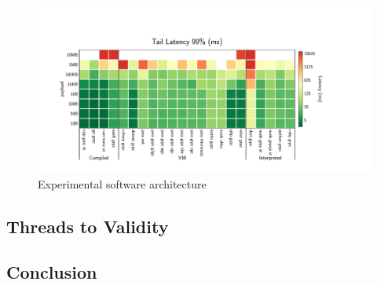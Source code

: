 \begin{figure}[!hbt]
    \begin{center}
        \includegraphics[width=1.2\linewidth]{imgs/tail99_payload}
    \end{center}
    \caption{Experimental software architecture}\label{fig:tail99_payload}
\end{figure}


\subsection{Threads to Validity}



\subsection{Conclusion}
